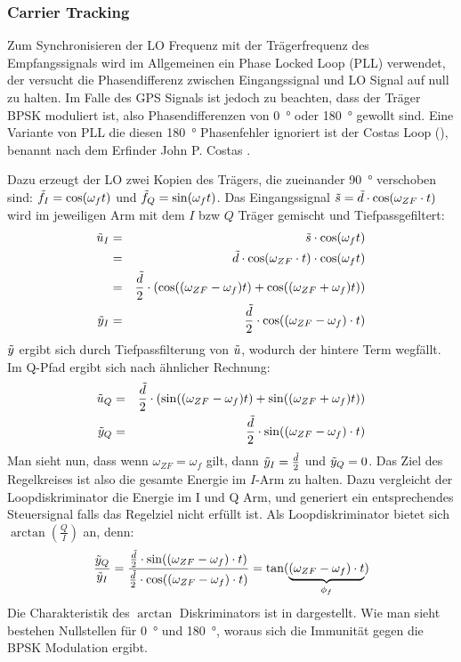 \subsubsection{Carrier Tracking}
Zum Synchronisieren der LO Frequenz mit der Trägerfrequenz des Empfangssignals wird im Allgemeinen ein Phase Locked Loop (PLL) verwendet, der versucht die Phasendifferenz zwischen Eingangssignal und LO Signal auf null zu halten. Im Falle des GPS Signals ist jedoch zu beachten, dass der Träger BPSK moduliert ist, also Phasendifferenzen von \SI{0}{\degree} oder \SI{180}{\degree} gewollt sind. Eine Variante von PLL die diesen \SI{180}{\degree} Phasenfehler ignoriert ist der Costas Loop (), benannt nach dem Erfinder John P. Costas \cite{CostasSyncComm}.


Dazu erzeugt der LO zwei Kopien des Trägers, die zueinander \SI{90}{\degree} verschoben sind: $\tilde{f}_I=\cos(\omega_{f} t)$ und  $\tilde{f}_Q=\sin(\omega_{f} t)$. Das Eingangssignal $\tilde{s}=\tilde{d} \cdot \cos(\omega_{ZF} \cdot t)$ wird im jeweiligen Arm mit dem $I$ bzw $Q$ Träger gemischt und Tiefpassgefiltert:
\begin{eqnarray}
	\tilde{u}_I &=& \tilde{s} \cdot \cos(\omega_{f} t)\\
		    &=& \tilde{d} \cdot \cos(\omega_{ZF} \cdot t) \cdot \cos(\omega_{f} t)\\
            &=& \frac{\tilde{d}}{2} \cdot (\cos((\omega_{ZF}-\omega_{f}) t)+ \cos((\omega_{ZF}+\omega_{f}) t)) \\
    \tilde{y}_I &=& \frac{\tilde{d}}{2} \cdot \cos((\omega_{ZF}-\omega_{f})\cdot t)
\end{eqnarray}
$\tilde{y}$  ergibt sich durch Tiefpassfilterung von $\tilde{u}$, wodurch der hintere Term wegfällt. Im Q-Pfad ergibt sich nach ähnlicher Rechnung:
\begin{eqnarray}
\tilde{u}_Q &=& \frac{\tilde{d}}{2} \cdot (\sin((\omega_{ZF}-\omega_{f}) t)+ \sin((\omega_{ZF}+\omega_{f}) t))\\
\tilde{y}_Q &=& \frac{\tilde{d}}{2} \cdot \sin((\omega_{ZF}-\omega_{f})\cdot t)
\end{eqnarray}
Man sieht nun, dass wenn $\omega_{ZF}=\omega_{f}$ gilt, dann $\tilde{y}_I = \frac{\tilde{d}}{2}$  und $\tilde{y}_Q =0$. Das Ziel des Regelkreises ist also die gesamte Energie im $I$-Arm zu halten. 
Dazu vergleicht der Loopdiskriminator die Energie im I und Q Arm, und generiert ein entsprechendes Steuersignal falls das Regelziel nicht erfüllt ist. Als Loopdiskriminator bietet sich $\arctan\left(\frac{Q}{I}\right)$ an, denn: 
\begin{equation}
	\frac{\tilde{y}_Q}{\tilde{y}_I} = \frac{ \frac{\tilde{d}}{2} \cdot \sin((\omega_{ZF}-\omega_{f})\cdot t)}{\frac{\tilde{d}}{2} \cdot \cos((\omega_{ZF}-\omega_{f})\cdot t)} = \tan({\underbrace{(\omega_{ZF}-\omega_{f})\cdot t}_{\phi_f}})
\end{equation}
Die Charakteristik des $\arctan$ Diskriminators ist in  dargestellt. Wie man sieht bestehen Nullstellen für \SI{0}{\degree} und \SI{180}{\degree}, woraus sich die Immunität gegen die BPSK Modulation ergibt.

